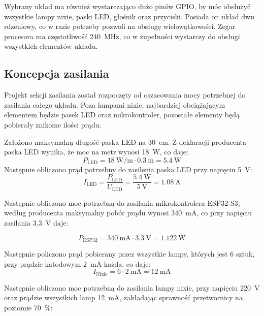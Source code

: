\documentclass{article}
\begin{document}
Wybrany układ ma również wystarczająco dużo pinów GPIO, by móc obsłużyć wszystkie lampy nixie, paski LED, głośnik oraz przyciski.
Posiada on układ dwu rdzeniowy, co w razie potrzeby pozwoli na obsługę wielowątkowości. Zegar procesora ma częstotliwość \SI{240}{\mega\hertz},
co w zupełności wystarczy do obsługi wszystkich elementów układu.

\subsection{Koncepcja zasilania}
Projekt sekcji zasilania został rozpoczęty od oszacowania mocy potrzebnej do zasilania całego układu.
Poza lampami nixie, najbardziej obciążającym elementem będzie pasek LED oraz mikrokontroler, pozostałe elementy będą pobierały znikome ilości prądu.

Założono maksymalną długość paska LED na \SI{30}{\centi\meter}. Z deklaracji producenta paska LED wynika, że moc na metr wynosi \SI{18}{\watt}, co daje:
\begin{equation}
    P_{\text{LED}} = \SI{18}{\watt\per\meter} \cdot \SI{0.3}{\meter} = \SI{5.4}{\watt}
\end{equation}
Następnie obliczono prąd potrzebny do zasilenia paska LED przy napięciu \SI{5}{\volt}:
\begin{equation}
    I_{\text{LED}} = \frac{P_{\text{LED}}}{U_{\text{LED}}} = \frac{\SI{5.4}{\watt}}{\SI{5}{\volt}} = \SI{1.08}{\ampere}
\end{equation}

Następnie obliczono moc potrzebną do zasilania mikrokontrolera ESP32-S3, według producenta maksymalny pobór prądu wynosi \SI{340}{\milli\ampere},
co przy napięciu zasilania \SI{3.3}{\volt} daje:

\begin{equation}
    P_{\text{ESP32}} = \SI{340}{\milli\ampere} \cdot \SI{3.3}{\volt} = \SI{1.122}{\watt}
\end{equation}

Następnie policzono prąd pobierany przez wszystkie lampy, których jest 6 sztuk, przy prądzie katodowym \SI{2}{\milli\ampere} każda, co daje:
\begin{equation}
    I_{\text{Nixie}} = 6 \cdot \SI{2}{\milli\ampere} = \SI{12}{\milli\ampere}
\end{equation}

Następnie obliczono moc potrzebną do zasilania lampy nixie, przy napięciu \SI{220}{\volt} oraz prądzie wszystkich lamp \SI{12}{\milli\ampere}, zakładając 
sprawność przetwornicy na poziomie \SI{70}{\percent}:
\end{document}

